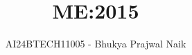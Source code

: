 \documentclass[journal]{IEEEtran}
\begin{document}

\vspace{3cm}

\title{ME:\hfill{2015}}
\author{AI24BTECH11005 - Bhukya Prajwal Naik
}
{\let\newpage\relax\maketitle}

\renewcommand{\thefigure}{\theenumi}
\renewcommand{\thetable}{\theenumi}
\setlength{\intextsep}{10pt} %


\renewcommand{\thetable}{\theenumi}
\end{document}
